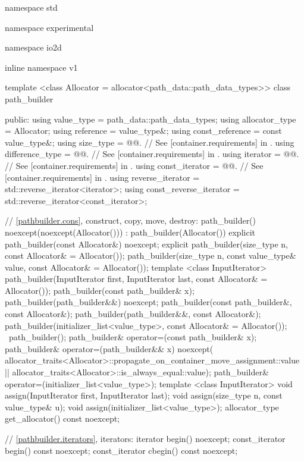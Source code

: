 \begin{codeblock}
namespace std { namespace experimental { namespace io2d { inline namespace v1 {
  template <class Allocator = allocator<path_data::path_data_types>>
  class path_builder {
  public:
    using value_type = path_data::path_data_types;
    using allocator_type = Allocator;
    using reference = value_type&;
    using const_reference = const value_type&;
    using size_type       = @@. // See [container.requirements] in \cppseventeen.
    using difference_type = @@. // See [container.requirements] in \cppseventeen.
    using iterator       = @@. // See [container.requirements] in \cppseventeen.
    using const_iterator = @@. // See [container.requirements] in \cppseventeen.
    using reverse_iterator       = std::reverse_iterator<iterator>;
    using const_reverse_iterator = std::reverse_iterator<const_iterator>;
    
    // \ref{pathbuilder.cons}, construct, copy, move, destroy:
    path_builder() noexcept(noexcept(Allocator())) :
      path_builder(Allocator()) { }
    explicit path_builder(const Allocator&) noexcept;
    explicit path_builder(size_type n, const Allocator& = Allocator());
    path_builder(size_type n, const value_type& value,
      const Allocator& = Allocator());
    template <class InputIterator>
    path_builder(InputIterator first, InputIterator last,
      const Allocator& = Allocator());
    path_builder(const path_builder& x);
    path_builder(path_builder&&) noexcept;
    path_builder(const path_builder&, const Allocator&);
    path_builder(path_builder&&, const Allocator&);
    path_builder(initializer_list<value_type>, const Allocator& = Allocator());
    ~path_builder();
    path_builder& operator=(const path_builder& x);
    path_builder& operator=(path_builder&& x)
      noexcept(
      allocator_traits<Allocator>::propagate_on_container_move_assignment::value
      ||
      allocator_traits<Allocator>::is_always_equal::value);
    path_builder& operator=(initializer_list<value_type>);
    template <class InputIterator>
    void assign(InputIterator first, InputIterator last);
    void assign(size_type n, const value_type& u);
    void assign(initializer_list<value_type>);
    allocator_type get_allocator() const noexcept;
    
    // \ref{pathbuilder.iterators}, iterators:
    iterator begin() noexcept;
    const_iterator begin() const noexcept;
    const_iterator cbegin() const noexcept;

}}}}}
\end{codeblock}
